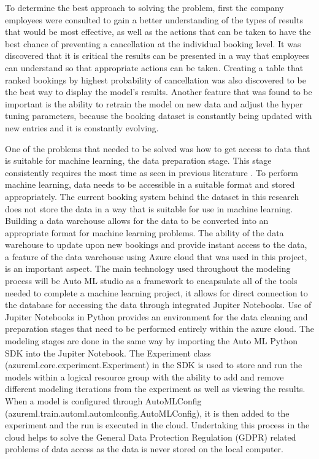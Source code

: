 \vspace{5mm}

To determine the best approach to solving the problem,  first the company employees were consulted to gain a better understanding of the types of results that would be most effective, as well as the actions that can be taken to have the best chance of preventing a cancellation at the individual booking level. It was discovered that it is critical the results can be presented in a way that employees can understand so that appropriate actions can be taken. Creating a table that ranked bookings by highest probability of cancellation was also discovered to be the best way to display the model's results. Another feature that was found to be important is the ability to retrain the model on new data and adjust the hyper tuning parameters, because the booking dataset is constantly being updated with new entries and it is constantly evolving.

\vspace{5mm}

One of the problems that needed to be solved was how to get access to data that is suitable for machine learning, the data preparation stage. This stage consistently requires the most time as seen in previous literature \cite{Zhang2003DataMining}. To perform machine learning, data needs to be accessible in a suitable format and stored appropriately. The current booking system behind the dataset in this research does not store the data in a way that is suitable for use in machine learning. Building a data warehouse allows for the data to be converted into an appropriate format for machine learning problems. The ability of the data warehouse to update upon new bookings and provide instant access to the data, a feature of the data warehouse using Azure cloud that was used in this project, is an important aspect. The main technology used throughout the modeling process will be Auto ML studio as a framework to encapsulate all of the tools needed to complete a machine learning project, it allows for direct connection to the database for accessing the data through integrated Jupiter Notebooks. Use of Jupiter Notebooks in Python provides an environment for the data cleaning and preparation stages that need to be performed entirely within the azure cloud. The modeling stages are done in the same way by importing the Auto ML Python SDK into the Jupiter Notebook. The Experiment class (azureml.core.experiment.Experiment) in the SDK is used to store and run the models within a logical resource group with the ability to add and remove different modeling iterations from the experiment as well as viewing the results. When a model is configured through AutoMLConfig (azureml.train.automl.automlconfig.AutoMLConfig), it is then added to the experiment and the run is executed in the cloud. Undertaking this process in the cloud helps to solve the General Data Protection Regulation (GDPR) related problems of data access as the data is never stored on the local computer.



